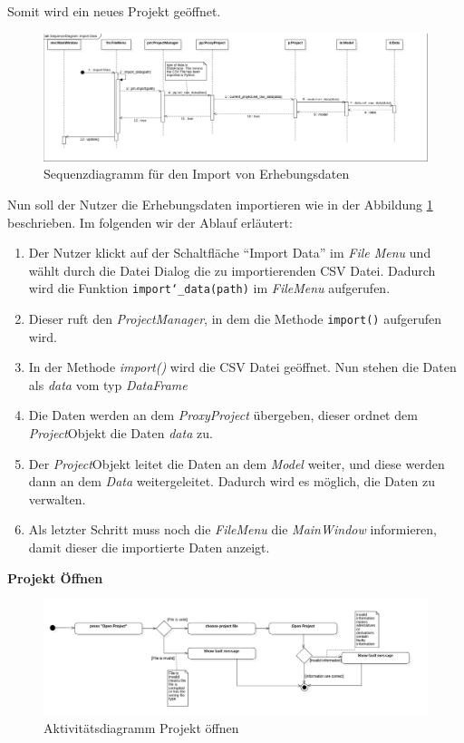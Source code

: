 \documentclass{article}
\begin{document}
Somit wird ein neues Projekt geöffnet.
\begin{figure}[H]%
    \includegraphics[width=15cm]{entwurf/Entwurf_dokument/img/Alissa/SQImportDataFinal.png}
    \caption{Sequenzdiagramm für den Import von Erhebungsdaten}
    \label{fig:sq:importData}
\end{figure}
Nun soll der Nutzer die Erhebungsdaten importieren wie in der Abbildung \ref{fig:sq:importData} beschrieben. Im folgenden wir der Ablauf erläutert:
\begin{enumerate}
    \item[1.] Der Nutzer klickt auf der Schaltfläche \enquote{Import Data} im \textit{File Menu} und wählt durch die Datei Dialog die zu importierenden CSV Datei. Dadurch wird die Funktion \texttt{import\char`_data(path)} im \textit{FileMenu} aufgerufen.
    \item[2.] Dieser ruft den \textit{ProjectManager}, in dem die Methode \texttt{import()} aufgerufen wird.
    \item[3.] In der Methode \textit{import()} wird die CSV Datei geöffnet. Nun stehen die Daten als \textit{data} vom typ \textit{DataFrame}
    \item[4.] Die Daten werden an dem \textit{ProxyProject} übergeben, dieser ordnet dem \textit{Project}\textendash Objekt die Daten \textit{data} zu.
    \item[5.] Der \textit{Project}\textendash Objekt leitet die Daten an dem \textit{Model} weiter, und diese werden dann an dem \textit{Data} weitergeleitet. Dadurch wird es möglich, die Daten zu verwalten.
    \item[6.] Als letzter Schritt muss noch die \textit{FileMenu} die \textit{MainWindow} informieren, damit dieser die importierte Daten anzeigt. 
\end{enumerate}
\newpage
\textbf{\large{Projekt Öffnen}}
\begin{figure}[H]%
    \centering
    \includegraphics[width=13cm]{entwurf/Entwurf_dokument/img/Alissa/OpenProjectAD.png}
    \caption{Aktivitätsdiagramm Projekt öffnen}
    \label{ADProjektÖffnen}
\end{figure}
\end{document}
